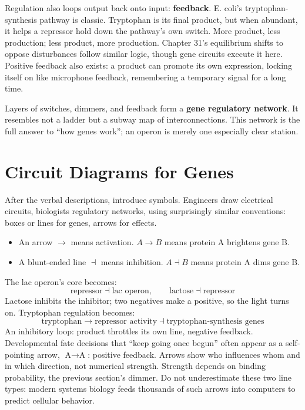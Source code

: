 Regulation also loops output back onto input: \textbf{feedback}. E. coli's tryptophan-synthesis pathway is classic. Tryptophan is its final product, but when abundant, it helps a repressor hold down the pathway's own switch. More product, less production; less product, more production. Chapter 31's equilibrium shifts to oppose disturbances follow similar logic, though gene circuits execute it here. Positive feedback also exists: a product can promote its own expression, locking itself on like microphone feedback, remembering a temporary signal for a long time.

Layers of switches, dimmers, and feedback form a \textbf{gene regulatory network}. It resembles not a ladder but a subway map of interconnections. This network is the full answer to ``how genes work''; an operon is merely one especially clear station.

\section{Circuit Diagrams for Genes}

After the verbal descriptions, introduce symbols. Engineers draw electrical circuits, biologists regulatory networks, using surprisingly similar conventions: boxes or lines for genes, arrows for effects.

\begin{itemize}[itemsep=2pt]
\item An arrow $\rightarrow$ means activation. $A \rightarrow B$ means protein A brightens gene B.
\item A blunt-ended line $\dashv$ means inhibition. $A \dashv B$ means protein A dims gene B.
\end{itemize}

The lac operon's core becomes:
\[
\text{repressor} \dashv \text{lac operon}, \qquad \text{lactose} \dashv \text{repressor}
\]
Lactose inhibits the inhibitor; two negatives make a positive, so the light turns on. Tryptophan regulation becomes:
\[
\text{tryptophan} \rightarrow \text{repressor activity} \dashv \text{tryptophan-synthesis genes}
\]
An inhibitory loop: product throttles its own line, negative feedback. Developmental fate decisions that ``keep going once begun'' often appear as a self-pointing arrow, $\text{A} \rightarrow \text{A}$: positive feedback. Arrows show who influences whom and in which direction, not numerical strength. Strength depends on binding probability, the previous section's dimmer. Do not underestimate these two line types: modern systems biology feeds thousands of such arrows into computers to predict cellular behavior.

